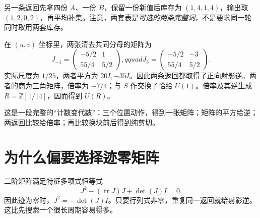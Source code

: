 \documentclass[11pt,a4paper,oneside,openany]{book}
\newcommand{\Z}{\mathbb Z}
\theoremstyle{definition}
\numberwithin{equation}{chapter}
\begin{document}
另一条返回先拿四份 $A$、一份 $B$，保留一份新值后库存为 $(1,4,1,4)$，输出取 $(1,2,0,2)$，再平均补集。注意，两套表是\emph{可选的两条完整词}，不是要求同一轮同时取用两套库存。

在 $(u,v)$ 坐标里，两张清去共同分母的矩阵为
\[
J_{-1}=\begin{pmatrix}-5/2&1\\55/4&5/2\end{pmatrix},qquad
J_3=\begin{pmatrix}-5/2&-3\\55/4&5/2\end{pmatrix}.
\]
实际尺度为 $1/25$，两者平方为 $20I,-35I$。因此两条返回都取得了正向射影逆。两者的商为三角矩阵，倍率为 $-7/4$；与 $S$ 作交换子恰给 $U(1)$。倍率及其逆生成 $R=\Z[1/14]$，因而得到 $U(R)$。

这是一段完整的“计数变代数”：三个位置动作，得到一张矩阵；矩阵的平方给逆；两返回比较给倍率；再比较换块前后得到纯剪切。

\section{为什么偏要选择迹零矩阵}
二阶矩阵满足特征多项式恒等式
\[J^2-(\operatorname{tr}J)J+\det(J)I=0.
\]
因此迹为零时，$J^2=-\det(J)I$。只要行列式非零，重复同一返回就给射影逆。这比先搜索一个很长周期容易得多。
\end{document}
